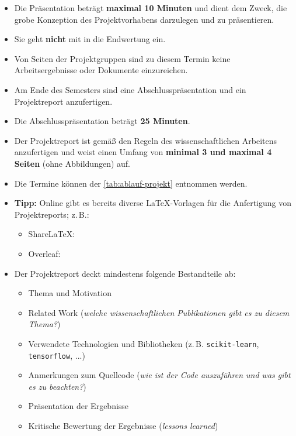 \begin{frame}
	\begin{itemize}
		\item Die Präsentation beträgt \textbf{maximal 10 Minuten} und dient dem Zweck, die grobe Konzeption des Projektvorhabens darzulegen und zu präsentieren.
		\item Sie geht \textbf{nicht} mit in die Endwertung ein.
		\item Von Seiten der Projektgruppen sind zu diesem Termin keine Arbeitsergebnisse oder Dokumente einzureichen.
	\end{itemize}
	
	\vspace*{3mm}
	\begin{itemize}
		\item Am Ende des Semesters sind eine Abschlusspräsentation und ein Projektreport anzufertigen.
		\item Die Abschlusspräsentation beträgt \textbf{25 Minuten}.
		\item Der Projektreport ist gemäß den Regeln des wissenschaftlichen Arbeitens anzufertigen und weist einen Umfang von \textbf{minimal 3 und maximal 4 Seiten} (ohne Abbildungen) auf.
		\item Die Termine können der \cref{tab:ablauf-projekt} entnommen werden.
	\end{itemize}
\end{frame}


\begin{frame}
	\begin{itemize}
		\item \textbf{Tipp:} Online gibt es bereits diverse \LaTeX-Vorlagen für die Anfertigung von Projektreports; z.\,B.:
		\begin{itemize}
			\item ShareLaTeX: \sharelatex
			\item Overleaf: \overleaf
		\end{itemize}
		\item Der Projektreport deckt mindestens folgende Bestandteile ab:
		\begin{itemize}
			\item Thema und Motivation
			\item Related Work (\textit{welche wissenschaftlichen Publikationen gibt es zu diesem Thema?})
			\item Verwendete Technologien und Bibliotheken (z.\,B. \texttt{scikit-learn}, \texttt{tensorflow}, ...)
			\item Anmerkungen zum Quellcode (\textit{wie ist der Code auszuführen und was gibt es zu beachten?})
			\item Präsentation der Ergebnisse
			\item Kritische Bewertung der Ergebnisse (\textit{\glqq{}lessons learned\grqq{}})
		\end{itemize}
	\end{itemize}

\end{frame}


